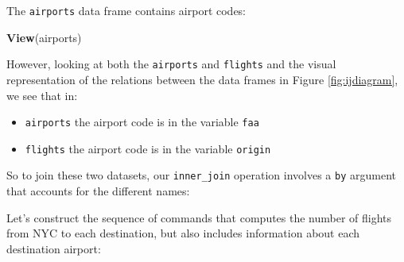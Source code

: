\documentclass[12pt,]{krantz}
\makeatletter
\newenvironment{Shaded}{\begin{snugshade}}{\end{snugshade}}
\newcommand{\KeywordTok}[1]{\textcolor[rgb]{0.27,0.27,0.27}{\textbf{#1}}}
\newcommand{\DataTypeTok}[1]{\textcolor[rgb]{0.27,0.27,0.27}{#1}}
\newcommand{\StringTok}[1]{\textcolor[rgb]{0.5,0.5,0.5}{#1}}
\newcommand{\OperatorTok}[1]{\textcolor[rgb]{0.43,0.43,0.43}{\textbf{#1}}}
\newcommand{\NormalTok}[1]{#1}
\providecommand{\tightlist}{%
  \setlength{\itemsep}{0pt}\setlength{\parskip}{0pt}}
\newenvironment{kframe}{%
\medskip{}
\setlength{\fboxsep}{.8em}
 \def\at@end@of@kframe{}%
 \ifinner\ifhmode%
  \def\at@end@of@kframe{\end{minipage}}%
  \begin{minipage}{\columnwidth}%
 \fi\fi%
 \def\FrameCommand##1{\hskip\@totalleftmargin \hskip-\fboxsep
 \colorbox{shadecolor}{##1}\hskip-\fboxsep
     \hskip-\linewidth \hskip-\@totalleftmargin \hskip\columnwidth}%
 \MakeFramed {\advance\hsize-\width
   \@totalleftmargin\z@ \linewidth\hsize
   \@setminipage}}%
 {\par\unskip\endMakeFramed%
 \at@end@of@kframe}
\renewenvironment{Shaded}{\begin{kframe}}{\end{kframe}}
\theoremstyle{definition}
\theoremstyle{definition}
\theoremstyle{definition}
\theoremstyle{remark}
\makeatother
\begin{document}
The \texttt{airports} data frame contains airport codes:

\begin{Shaded}
\begin{Highlighting}[]
\KeywordTok{View}\NormalTok{(airports)}
\end{Highlighting}
\end{Shaded}

However, looking at both the \texttt{airports} and \texttt{flights} and
the visual representation of the relations between the data frames in
Figure \ref{fig:ijdiagram}, we see that in:

\begin{itemize}
\tightlist
\item
  \texttt{airports} the airport code is in the variable \texttt{faa}
\item
  \texttt{flights} the airport code is in the variable \texttt{origin}
\end{itemize}

So to join these two datasets, our \texttt{inner\_join} operation
involves a \texttt{by} argument that accounts for the different names:

\begin{Shaded}
\end{Shaded}

Let's construct the sequence of commands that computes the number of
flights from NYC to each destination, but also includes information
about each destination airport:

\begin{Shaded}
\end{Shaded}
\end{document}
